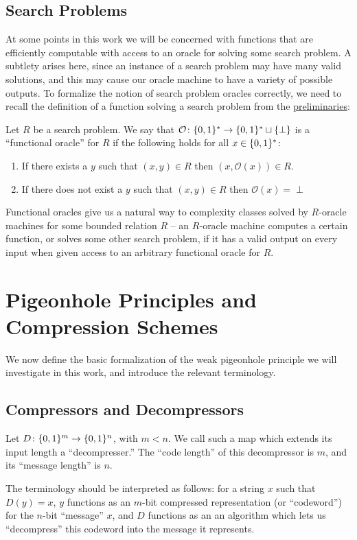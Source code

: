 \subsection{Search Problems}\label{lossy:subsec:search-problems}
At some points in this work we will be concerned with functions that are efficiently computable with access to an oracle for solving some search problem. A subtlety arises here, since an instance of a search problem may have many valid solutions, and this may cause our oracle machine to have a variety of possible outputs. To formalize the notion of search problem oracles correctly, we need to recall the definition of a function solving a search problem from the \hyperref[chap:prelims]{preliminaries}:
\begin{definition}
Let $R$ be a search problem. We say that $\mathcal{O}\colon \{0,1\}^* \rightarrow \{0,1\}^* \sqcup \{\perp\}$ is a ``functional oracle'' for $R$ if the following holds for all $x \in \{0,1\}^*$:
\begin{enumerate}
    \item If there exists a $y$ such that $(x,y) \in R$ then $(x,\mathcal{O}(x)) \in R$.
    \item If there does not exist a $y$ such that $(x,y) \in R$ then $\mathcal{O}(x) = \perp$
\end{enumerate} 
\end{definition}
Functional oracles give us a natural way to complexity classes solved by $R$-oracle machines for some bounded relation $R$ -- an $R$-oracle machine computes a certain function, or solves some other search problem, if it has a valid output on every input when given access to an arbitrary functional oracle for $R$.

\section{Pigeonhole Principles and Compression Schemes}\label{lossy:sec:pigeons}

We now define the basic formalization of the weak pigeonhole principle we will investigate in this work, and introduce the relevant terminology.
\subsection{Compressors and Decompressors}\label{lossy:subsec:gi}
\begin{definition}
Let $D\colon \{0,1\}^m \rightarrow \{0,1\}^n$, with $m < n$. We call such a map which extends its input length a ``decompresser.'' The ``code length'' of this decompressor is $m$, and its ``message length'' is $n$.
\end{definition}
The terminology should be interpreted as follows: for a string $x$ such that $D(y)=x$, $y$ functions as an $m$-bit compressed representation (or ``codeword'') for the $n$-bit ``message'' $x$, and $D$ functions as an an algorithm which lets us ``decompress'' this codeword into the message it represents.

